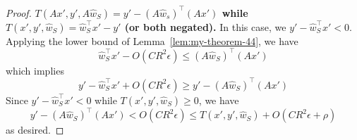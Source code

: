 \documentclass[english]{article}
\theoremstyle{plain}
\begin{document}
\begin{proof}
\textbf{$T(Ax',y',A\widehat{w}_{S})=y'-\left(A\widehat{w}_{s}\right)^{\top}\left(Ax'\right)$
while $T(x',y',\widehat{w}_{S})=\widehat{w}_{S}^{\top}x'-y'$ (or
both negated).} In this case, we $y'-\widehat{w}_{S}^{\top}x'<0$.
Applying the lower bound of Lemma~\ref{lem:my-theorem-44},
we have
\[
\widehat{w}_{S}^{\top}x'-O(CR^{2}\epsilon)\leq\left(A\widehat{w}_{S}\right)^{\top}\left(Ax'\right)
\]
which implies
\[
y'-\widehat{w}_{S}^{\top}x'+O(CR^{2}\epsilon)\geq y'-\left(A\widehat{w}_{S}\right)^{\top}\left(Ax'\right)
\]
Since $y'-\widehat{w}_{S}^{\top}x'<0$ while $T(x',y',\widehat{w}_{S})\geq0$,
we have
\[
y'-\left(A\widehat{w}_{S}\right)^{\top}\left(Ax'\right)<O(CR^{2}\epsilon)\leq T(x',y',\widehat{w}_{S})+O(CR^{2}\epsilon+\rho)
\]
as desired.
\end{proof}
\end{document}
